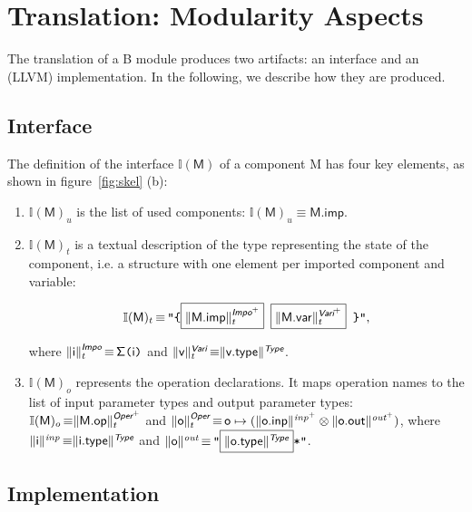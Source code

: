 \documentclass{llncs}
\newcommand{\trad}[2]{\ensuremath{\lVert \textsf{#1} \rVert^{\textit{#2}}}}
\DeclareMathOperator{\isdef}{\equiv}
\newcommand{\llvm}[1]{\texttt{#1}}
\newcommand{\B}[1]{\textsf{#1}}
\newcommand{\ListOf}[1]{$\mbox{#1}^+$}
\newcommand{\PH}[1]{\framebox{$#1$}}
\newcommand{\sep}[0]{\otimes}
\newcommand{\intf}[0]{\ensuremath{\mathbb{I}}}
\newcommand{\state}[0]{\ensuremath{\sf\Sigma}}
\begin{document}
\section{Translation: Modularity Aspects}
\label{sec:module}

The translation of a B module produces two artifacts: an interface and an (LLVM)
implementation. In the following, we describe how they are produced.

\subsection{Interface}

The definition of the interface $\intf(\B{M})$ of a component \B{M} has four
key elements, as shown in figure~\ref{fig:skel} (b):
\begin{enumerate}
\item $\intf(\B{M})_u$ is the list of used components: $\intf(\B{M})_u \isdef \B{M.imp}$.

\item $\intf(\B{M})_t$ is a textual description of the type representing the
  state of the component, i.e. a structure with one element per imported
  component and variable:
\begin{small}
$$\intf(\B{M})_t \isdef \llvm{"\{\PH{\trad{\B{M.imp}}{\ListOf{\B{Impo}}}_t} \PH{\trad{\B{M.var}}{\ListOf{\B{Vari}}}_t} \}"},$$
\end{small}
where $\trad{\B{i}}{\B{Impo}}_t \isdef \llvm{\state(\B{i})}$ and
$\trad{\B{v}}{\B{Vari}}_t \isdef \trad{\B{v.type}}{\B{Type}}$.

\item $\intf(\B{M})_o$ represents the operation declarations. It maps
operation names to the list of input parameter types and output parameter
types:
$\intf(\B{M})_o \isdef \trad{\B{M.op}}{\ListOf{\B{Oper}}}_t$ and
$\trad{\B{o}}{\B{Oper}}_t \isdef \B{o} \mapsto ( \trad{\B{o.inp}}{\ListOf{inp}} \sep \trad{\B{o.out}}{\ListOf{out}} )$, where
$\trad{\B{i}}{inp} \isdef \trad{\B{i.type}}{\B{Type}}$ and
$\trad{\B{o}}{out} \isdef \llvm{"\PH{\trad{\B{o.type}}{\B{Type}}}*"}$.
\end{enumerate}

\subsection{Implementation}
\end{document}

